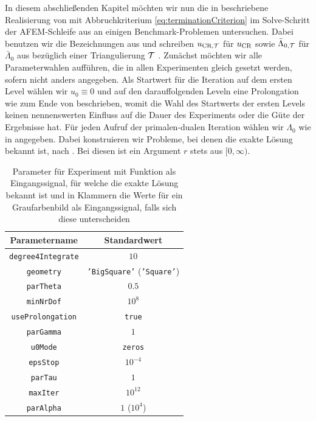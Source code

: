 \newcommand{\precDTL}{5} %
In diesem abschließenden Kapitel möchten wir nun die in
 beschriebene Realisierung von
 mit Abbruchkriterium
\eqref{eq:terminationCriterion} im Solve-Schritt der AFEM-Schleife aus
 an einigen Benchmark-Problemen untersuchen.
Dabei benutzen wir die Bezeichnungen aus  und
schreiben $u_{\textup{CR}, \mathcal{T}}$ für $u_\textup{CR}$ sowie $\bar\Lambda_{0,\mathcal{T}}$ für $\bar\Lambda_0$
aus  bezüglich einer Triangulierung $\mathcal{T}$ .
Zunächst möchten wir alle Parameterwahlen aufführen, die in allen 
Experimenten gleich gesetzt werden, sofern nicht anders angegeben.
Als Startwert für die Iteration auf dem ersten Level wählen wir
$u_0\equiv 0$ und auf den darauffolgenden Leveln eine Prolongation wie zum
Ende von  beschrieben, womit die Wahl des Startwerts
der ersten Levels keinen nennenswerten Einfluss auf die Dauer des Experiments
oder die Güte der Ergebnisse hat. 
Für jeden Aufruf der primalen-dualen Iteration wählen wir $\Lambda_0$ wie in
 angegeben.
Dabei konstruieren wir Probleme, bei denen die exakte Lösung bekannt ist,
nach . 
Bei diesen ist ein Argument $r$ stets aus $[0,\infty)$.
\begin{table}[p]
  \centering
  \begin{tabular}{c|c}
    \hline 
    Parametername & Standardwert\\
    \hline 
    \texttt{degree4Integrate}&
    $10$\\
    \texttt{geometry} &
    \texttt{'BigSquare'} (\texttt{'Square'})\\
    \texttt{parTheta} &
    $0.5$\\
    \texttt{minNrDof} &
    $10^8$\\
    \texttt{useProlongation} &
    \texttt{true}\\
    \texttt{parGamma} &
    $1$\\
    \texttt{u0Mode} &
    \texttt{zeros}\\
    \texttt{epsStop} &
    $10^{-4}$\\
    \texttt{parTau} &
    $1$\\
    \texttt{maxIter} &
    $10^{12}$\\
    \texttt{parAlpha} &
    $1$ ($10^4$)\\
    \hline
  \end{tabular}
  \caption{Parameter für Experiment mit Funktion als Eingangssignal, für welche
  die exakte Lösung bekannt ist und in Klammern die Werte für ein 
  Graufarbenbild als Eingangssignal, falls sich diese unterscheiden}
  \label{tab:parameterStandardValues}
\end{table} 
